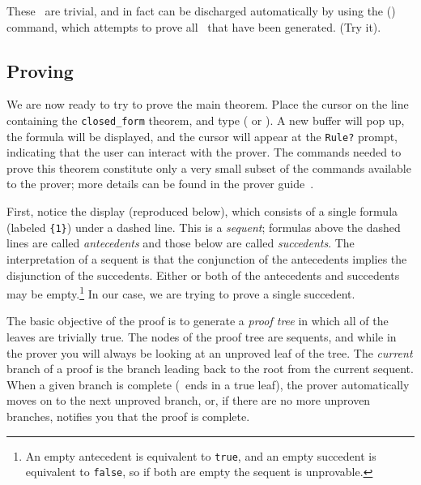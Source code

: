 These \tccs\ are trivial, and in fact can be discharged automatically
by using the  () command, which attempts
to prove all \tccs\ that have been generated.  (Try it).

\subsection{Proving}

We are now ready to try to prove the main theorem.  Place the cursor on
the line containing the {\tt closed\_form} theorem, and type
 ( or ).  A new buffer will pop up, the
formula will be displayed, and the cursor will appear at the {\tt Rule?}
prompt, indicating that the user can interact with the prover.  The
commands needed to prove this theorem constitute only a very small
subset of the commands available to the prover; more details can be
found in the prover guide~\cite{PVS:prover}.

First, notice the display (reproduced below), which consists of a
single formula (labeled {\tt \{1\}}) under a dashed line.  This is a
{\em sequent\/}; formulas above the dashed lines are called {\em
antecedents\/} and those below are called {\em succedents\/}.  The
interpretation of a sequent is that the conjunction of the antecedents
implies the disjunction of the succedents.  Either or both of the
antecedents and succedents may be empty.\footnote{An empty antecedent
is equivalent to {\tt true}, and an empty succedent is equivalent to
{\tt false}, so if both are empty the sequent is unprovable.} In our
case, we are trying to prove a single succedent.

The basic objective of the proof is to generate a {\em proof tree\/} in
which all of the leaves are trivially true.  The nodes of the proof tree
are sequents, and while in the prover you will always be looking at an
unproved leaf of the tree.  The {\em current\/} branch of a proof is the
branch leading back to the root from the current sequent.  When a given
branch is complete (\ie\ ends in a true leaf), the prover automatically
moves on to the next unproved branch, or, if there are no more unproven
branches, notifies you that the proof is complete.

